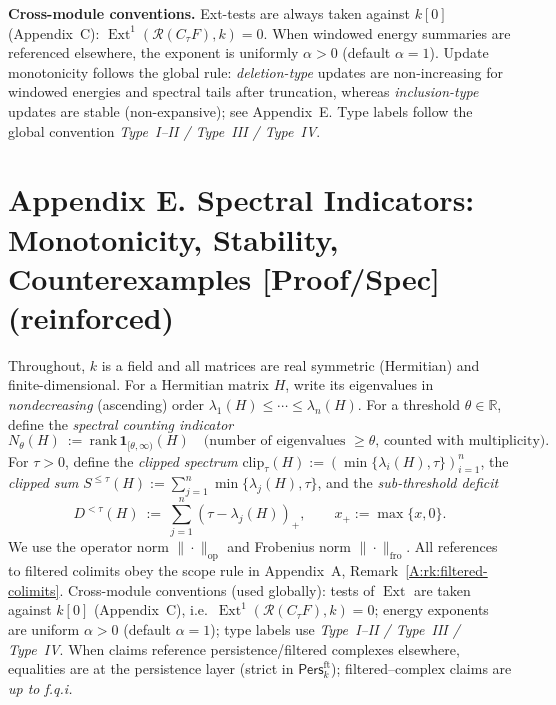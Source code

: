 \documentclass[11pt]{article}
\DeclareMathOperator{\Ext}{Ext}
\newcommand{\Pers}{\mathsf{Pers}}
\numberwithin{equation}{section}
\theoremstyle{definition}
\begin{document}
\medskip
\noindent\textbf{Cross-module conventions.}
Ext-tests are always taken against \(k[0]\) (Appendix~C): \(\Ext^1(\mathcal{R}(C_\tau F),k)=0\).
When windowed energy summaries are referenced elsewhere, the exponent is uniformly \(\alpha>0\) (default \(\alpha=1\)).
Update monotonicity follows the global rule: \emph{deletion-type} updates are non-increasing for windowed energies and spectral tails after truncation, whereas \emph{inclusion-type} updates are stable (non-expansive); see Appendix~E.
Type labels follow the global convention \emph{Type~I–II / Type~III / Type~IV}.



\section*{Appendix E. Spectral Indicators: Monotonicity, Stability, Counterexamples [Proof/Spec] (reinforced)}
{}

Throughout, \(k\) is a field and all matrices are real symmetric (Hermitian) and finite-dimensional.
For a Hermitian matrix \(H\), write its eigenvalues in \emph{nondecreasing} (ascending) order
\(\lambda_1(H)\le \cdots \le \lambda_n(H)\).
For a threshold \(\theta\in\mathbb{R}\), define the \emph{spectral counting indicator}
\[
N_\theta(H)\ :=\ \mathrm{rank}\,\mathbf{1}_{[\theta,\infty)}(H)\quad\text{(number of eigenvalues \(\ge\theta\), counted with multiplicity)}.
\]
For \(\tau>0\), define the \emph{clipped spectrum}
\(\mathrm{clip}_\tau(H):=(\min\{\lambda_i(H),\tau\})_{i=1}^n\), the \emph{clipped sum}
\(S^{\le \tau}(H):=\sum_{j=1}^n \min\{\lambda_j(H),\tau\}\), and the \emph{sub-threshold deficit}
\[
D^{<\tau}(H)\ :=\ \sum_{j=1}^n (\tau-\lambda_j(H))_+,\qquad x_+:=\max\{x,0\}.
\]
We use the operator norm \(\|\cdot\|_{\mathrm{op}}\) and Frobenius norm \(\|\cdot\|_{\mathrm{fro}}\).
All references to filtered colimits obey the scope rule in Appendix~A, Remark~\ref{A:rk:filtered-colimits}.
Cross-module conventions (used globally): tests of \(\Ext\) are taken against \(k[0]\) (Appendix~C), i.e.\ \(\Ext^1(\mathcal{R}(C_\tau F),k)=0\); energy exponents are uniform \(\alpha>0\) (default \(\alpha=1\)); type labels use \emph{Type~I--II / Type~III / Type~IV}.
When claims reference persistence/filtered complexes elsewhere, equalities are at the persistence layer (strict in \(\Pers^{\mathrm{ft}}_k\)); filtered–complex claims are \emph{up to f.q.i.}
\end{document}

